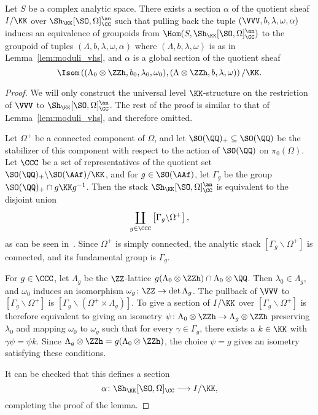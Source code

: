 \begin{lemma}\label{lem:moduli_vhs_k}
Let $S$ be a complex analytic space. There exists a section $\alpha$ of the quotient sheaf $I/\KK$ over $\Sh_{\KK}[\SO,\Omega]_{\CC}^{\an}$ such that pulling back the tuple $(\VVV,b,\lambda,\omega,\alpha)$ induces an equivalence of groupoids from $\Hom(S,\Sh_{\KK}[\SO,\Omega]_{\CC}^{\an})$ to the groupoid of tuples $(\Lambda,b,\lambda,\omega,\alpha)$ where $(\Lambda,b,\lambda,\omega)$ is as in Lemma~\ref{lem:moduli_vhs}, and $\alpha$ is a global section of the quotient sheaf
$$
\Isom\left((\Lambda_0 \otimes \ZZh,b_0,\lambda_0,\omega_0),(\Lambda \otimes \ZZh,b,\lambda,\omega)\right)/\KK.
$$
\end{lemma}
\begin{proof}
We will only construct the universal level $\KK$-structure on the restriction of $\VVV$ to $\Sh_{\KK}[\SO,\Omega]_{\CC}^{\an}$. The rest of the proof is similar to that of Lemma~\ref{lem:moduli_vhs}, and therefore omitted.

Let $\Omega^+$ be a connected component of $\Omega$, and let $\SO(\QQ)_+ \subseteq \SO(\QQ)$ be the stabilizer of this component with respect to the action of $\SO(\QQ)$ on $\pi_0(\Omega)$. Let $\CCC$ be a set of representatives of the quotient set $\SO(\QQ)_+\backslash \SO(\AAf) /\KK$, and for $g \in \SO(\AAf)$, let $\Gamma_g$ be the group $\SO(\QQ)_+ \cap g \KK g^{-1}$. Then the stack $\Sh_{\KK}[\SO,\Omega]_{\CC}^{\an}$ is equivalent to the disjoint union
\begin{equation}\label{eq:decomposition_shan}
\coprod_{g \in \CCC} \left[ \Gamma_g \backslash \Omega^+ \right],
\end{equation}
as can be seen in~\cite[Lemma~5.13]{MilneShimura}. Since $\Omega^+$ is simply connected, the analytic stack $\left[ \Gamma_g \backslash \Omega^+ \right]$ is connected, and its fundamental group is $\Gamma_g$.

For $g \in \CCC$, let $\Lambda_g$ be the $\ZZ$-lattice $g(\Lambda_0 \otimes \ZZh) \cap \Lambda_0 \otimes \QQ$. Then $\lambda_0 \in \Lambda_g$, and $\omega_0$ induces an isomorphism $\omega_g\colon \ZZ \rightarrow \det \Lambda_g$. The pullback of $\VVV$ to $[\Gamma_g \backslash \Omega^+]$ is $[\Gamma_g \backslash \left( \Omega^+ \times \Lambda_g \right)]$. To give a section of $I/\KK$ over $[\Gamma_g \backslash \Omega^+]$ is therefore equivalent to giving an isometry $\psi\colon \Lambda_0 \otimes \ZZh \rightarrow \Lambda_g \otimes \ZZh$ preserving $\lambda_0$ and mapping $\omega_0$ to $\omega_g$ such that for every $\gamma \in \Gamma_g$, there exists a $k \in \KK$ with $\gamma \psi = \psi k$. Since $\Lambda_g \otimes \ZZh = g(\Lambda_0 \otimes \ZZh)$, the choice $\psi = g$ gives an isometry satisfying these conditions. 

It can be checked that this defines a section
$$
\alpha\colon \Sh_{\KK}[\SO,\Omega]_{\CC} \longrightarrow I/\KK,
$$
completing the proof of the lemma.
\end{proof}

